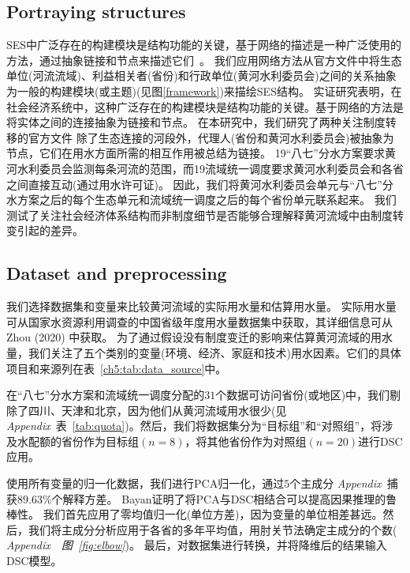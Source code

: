 \subsection{Portraying structures}\label{sec:structures}
SES中广泛存在的构建模块是结构功能的关键，基于网络的描述是一种广泛使用的方法，通过抽象链接和节点来描述它们~\cite{bodin2017a,kluger2020,guerrero2015}。
我们应用网络方法\cite{bodin2017b}从官方文件中将生态单位(河流流域)、利益相关者(省份)和行政单位(黄河水利委员会)之间的关系抽象为一般的构建模块(或主题)(见图\ref{framework})来描绘SES结构。
实证研究表明，在社会经济系统中，这种广泛存在的构建模块是结构功能的关键。基于网络的方法是将实体之间的连接抽象为链接和节点\cite{bodin2017a,kluger2020,guerrero2015}。
在本研究中，我们研究了两种关注制度转移的官方文件
除了生态连接的河段外，代理人(省份和黄河水利委员会)被抽象为节点，它们在用水方面所需的相互作用被总结为链接。
19“八七”分水方案要求黄河水利委员会监测每条河流的范围，而19流域统一调度要求黄河水利委员会和各省之间直接互动(通过用水许可证)。
因此，我们将黄河水利委员会单元与“八七”分水方案之后的每个生态单元和流域统一调度之后的每个省份单元联系起来。
我们测试了关注社会经济体系结构而非制度细节是否能够合理解释黄河流域中由制度转变引起的差异。

\subsection{Dataset and preprocessing}\label{sec:dataset}

我们选择数据集和变量来比较黄河流域的实际用水量和估算用水量。
实际用水量可从国家水资源利用调查的中国省级年度用水量数据集中获取，其详细信息可从Zhou (2020) \cite{zhou2020}中获取。
为了通过假设没有制度变迁的影响来估算黄河流域的用水量，我们关注了五个类别的变量(环境、经济、家庭和技术)用水因素。它们的具体项目和来源列在表~\ref{ch5:tab:data_source}中。



在“八七”分水方案和流域统一调度分配的$31$个数据可访问省份(或地区)中，我们剔除了四川、天津和北京，因为他们从黄河流域用水很少(见\textit{ Appendix}~表~\ref{tab:quota})。然后，我们将数据集分为“目标组”和“对照组”，将涉及水配额的省份作为目标组$(n=8)$，将其他省份作为对照组$(n=20)$进行DSC应用。

使用所有变量的归一化数据，我们进行PCA归一化，通过$5$个主成分\textit{ Appendix~}捕获$89.63\%$个解释方差。
Bayan证明了将PCA与DSC相结合可以提高因果推理\cite{bayani2021}的鲁棒性。
我们首先应用了零均值归一化(单位方差)，因为变量的单位相差甚远。然后，我们将主成分分析应用于各省的多年平均值，用肘关节法确定主成分的个数(\textit{ Appendix~~图~\ref{fig:elbow}})。
最后，对数据集进行转换，并将降维后的结果输入DSC模型。

